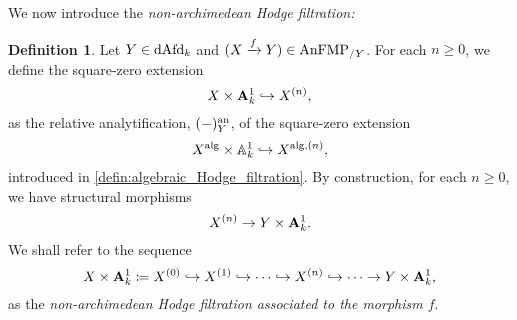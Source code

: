 \documentclass[10pt,a4paper,reqno]{amsart} %
\theoremstyle{plain}
\newtheorem{prop}[thm]{Proposition}
\theoremstyle{definition}
\newtheorem{defin}[thm]{Definition}
\theoremstyle{remark}
\numberwithin{equation}{section}
\begin{document}



We now introduce the \emph{non-archimedean Hodge filtration:}

\begin{defin}
    Let $Y \in \mathrm{dAfd}_k$ and $(X \xrightarrow{f} Y) \in \mathrm{AnFMP}_{/Y}$. For each $n \ge 0$, we define the square-zero extension
        \[
            X \times \mathbf A^1_k \hookrightarrow X^{(n)},  
        \]
    as the relative analytification, $(-) ^\mathrm{an}_Y$, of the square-zero extension
        \[
            X ^\mathrm{alg} \times \mathbb A^1_k \hookrightarrow X^{\mathrm{alg}, (n)},
        \]
    introduced in \cref{defin:algebraic_Hodge_filtration}.
    By construction, for each $n \ge 0$, we have structural morphisms
        \[
            X^{(n)} \to Y \times \mathbf A^1_k.  
        \]
    We shall refer to the sequence
        \[
            X \times \mathbf A^1_k \coloneqq X^{(0)} \hookrightarrow X^{(1)} \hookrightarrow \dots \hookrightarrow X^{(n)} \hookrightarrow \dots \to Y \times \mathbf A^1_k,  
        \]
    as the \emph{non-archimedean Hodge filtration associated to the morphism $f$}.
\end{defin}
\end{document}
